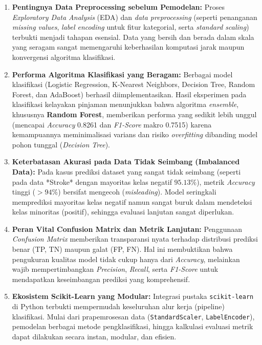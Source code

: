 \begin{enumerate}
    \item \textbf{Pentingnya Data Preprocessing sebelum Pemodelan:} Proses \textit{Exploratory Data Analysis} (EDA) dan \textit{data preprocessing} (seperti penanganan \textit{missing values}, \textit{label encoding} untuk fitur kategorial, serta \textit{standard scaling}) terbukti menjadi tahapan esensial. Data yang bersih dan berada dalam skala yang seragam sangat memengaruhi keberhasilan komputasi jarak maupun konvergensi algoritma klasifikasi.
    
    \item \textbf{Performa Algoritma Klasifikasi yang Beragam:} Berbagai model klasifikasi (Logistic Regression, K-Nearest Neighbors, Decision Tree, Random Forest, dan AdaBoost) berhasil diimplementasikan. Hasil eksperimen pada klasifikasi kelayakan pinjaman menunjukkan bahwa algoritma \textit{ensemble}, khususnya \textbf{Random Forest}, memberikan performa yang sedikit lebih unggul (mencapai \textit{Accuracy} 0.8261 dan \textit{F1-Score} makro 0.7515) karena kemampuannya meminimalisasi varians dan risiko \textit{overfitting} dibanding model pohon tunggal (\textit{Decision Tree}).
    
    \item \textbf{Keterbatasan Akurasi pada Data Tidak Seimbang (Imbalanced Data):} Pada kasus prediksi dataset yang sangat tidak seimbang (seperti pada data *Stroke* dengan mayoritas kelas negatif $95.13\%$), metrik \textit{Accuracy} tinggi ($>94\%$) bersifat mengecoh (\textit{misleading}). Model seringkali memprediksi mayoritas kelas negatif namun sangat buruk dalam mendeteksi kelas minoritas (positif), sehingga evaluasi lanjutan sangat diperlukan.
    
    \item \textbf{Peran Vital Confusion Matrix dan Metrik Lanjutan:} Penggunaan \textit{Confusion Matrix} memberikan transparansi nyata terhadap distribusi prediksi benar (TP, TN) maupun galat (FP, FN). Hal ini membuktikan bahwa pengukuran kualitas model tidak cukup hanya dari \textit{Accuracy}, melainkan wajib mempertimbangkan \textit{Precision}, \textit{Recall}, serta \textit{F1-Score} untuk mendapatkan keseimbangan prediksi yang komprehensif.
    
    \item \textbf{Ekosistem Scikit-Learn yang Modular:} Integrasi pustaka \texttt{scikit-learn} di Python terbukti mempermudah keseluruhan alur kerja (pipeline) klasifikasi. Mulai dari prapemrosesan data (\texttt{StandardScaler}, \texttt{LabelEncoder}), pemodelan berbagai metode pengklasifikasi, hingga kalkulasi evaluasi metrik dapat dilakukan secara instan, modular, dan efisien.
\end{enumerate}


